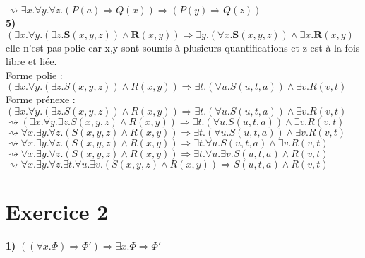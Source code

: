 \documentclass{article}
\begin{document}
$\rightsquigarrow \exists x.\forall y.\forall z.(P(a) \Rightarrow Q(x)) \Rightarrow (P(y)  \Rightarrow Q(z))$\\

\textbf{5)} $(\exists x. \forall y. (\exists z. \textbf{S}(x,y,z)) \land \textbf{R}(x,y)) \Rightarrow \exists y. (\forall x. \textbf{S}(x,y,z)) \land \exists x. \textbf{R}(x,y)$ elle n'est pas polie car x,y sont soumis à plusieurs quantifications et z est à la fois libre et liée.
\\

Forme polie :
\vspace{0.1cm}
$(\exists x.\forall y.(\exists z.S(x,y,z)) \wedge R(x,y)) \Rightarrow \exists t.(\forall u.S(u,t,a)) \wedge \exists v.R(v,t)$\\


Forme prénexe : 
\vspace{0.1cm}
$(\exists x.\forall y.(\exists z.S(x,y,z)) \wedge R(x,y)) \Rightarrow \exists t.(\forall u.S(u,t,a)) \wedge \exists v.R(v,t)$\\

$\rightsquigarrow (\exists x.\forall y.\exists z.S(x,y,z) \wedge R(x,y)) \Rightarrow \exists t.(\forall u.S(u,t,a)) \wedge \exists v.R(v,t)$\\

$\rightsquigarrow \forall x.\exists y.\forall z.(S(x,y,z) \wedge R(x,y)) \Rightarrow \exists t.(\forall u.S(u,t,a)) \wedge \exists v.R(v,t)$\\

$\rightsquigarrow \forall x.\exists y.\forall z.(S(x,y,z) \wedge R(x,y)) \Rightarrow \exists t.\forall u.S(u,t,a) \wedge \exists v.R(v,t)$\\

$\rightsquigarrow \forall x.\exists y.\forall z.(S(x,y,z) \wedge R(x,y)) \Rightarrow \exists t.\forall u.\exists v.S(u,t,a) \wedge R(v,t)$\\

$\rightsquigarrow \forall x.\exists y.\forall z.\exists t.\forall u.\exists v.(S(x,y,z) \wedge R(x,y)) \Rightarrow S(u,t,a) \wedge R(v,t)$



\section*{Exercice 2}

\textbf{1)} $((\forall x. \Phi) \Rightarrow \Phi ') \Rightarrow \exists x. \Phi \Rightarrow \Phi '  $
\end{document}
